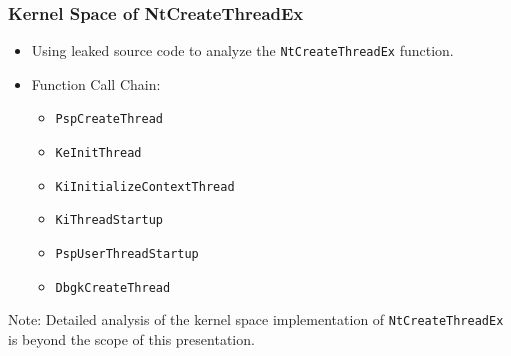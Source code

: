 \begin{frame}[fragile]
    \frametitle{Kernel Space of NtCreateThreadEx}
    \begin{itemize}
        \item Using leaked source code to analyze the \texttt{\color{blue}NtCreateThreadEx} function.
        \item Function Call Chain:
        \begin{itemize}
            \item \texttt{\color{blue}PspCreateThread}
            \item \texttt{\color{blue}KeInitThread}
            \item \texttt{\color{blue}KiInitializeContextThread}
            \item \texttt{\color{blue}KiThreadStartup}
            \item \texttt{\color{blue}PspUserThreadStartup}
            \item \texttt{\color{blue}DbgkCreateThread}
        \end{itemize}
    \end{itemize}

    Note: Detailed analysis of the kernel space implementation of \texttt{\color{blue}NtCreateThreadEx} is 
    beyond the scope of this presentation.

\end{frame}

